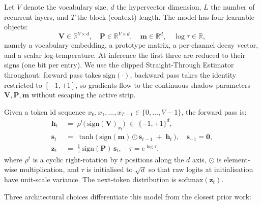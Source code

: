 \documentclass[runningheads]{llncs}
\newcommand{\bipset}{\{-1,+1\}}
\newcommand{\bV}{\mathbf{V}}
\newcommand{\bP}{\mathbf{P}}
\newcommand{\bm}{\mathbf{m}}
\newcommand{\bh}{\mathbf{h}}
\newcommand{\bs}{\mathbf{s}}
\newcommand{\bz}{\mathbf{z}}
\begin{document}
Let $V$ denote the vocabulary size, $d$ the hypervector dimension,
$L$ the number of recurrent layers, and $T$ the block (context) length.
The model has four learnable objects:
\[
\bV \in \mathbb{R}^{V\times d}, \quad
\bP \in \mathbb{R}^{V\times d}, \quad
\bm \in \mathbb{R}^{d}, \quad
\log\tau \in \mathbb{R},
\]
namely a vocabulary embedding, a prototype matrix, a per-channel decay
vector, and a scalar log-temperature. At inference the first three are
reduced to their signs (one bit per entry). We use the clipped
Straight-Through Estimator~\cite{bengio2013estimating,courbariaux2016binaryconnect}
throughout: forward pass takes $\mathrm{sign}(\cdot)$, backward pass
takes the identity restricted to $[-1,+1]$, so gradients flow to the
continuous shadow parameters $\bV, \bP, \bm$ without escaping the
active strip.

Given a token id sequence
$x_0, x_1, \dots, x_{T-1} \in \{0, \dots, V{-}1\}$, the forward pass is:
\begin{align}
\bh_t \;&=\; \rho^{t}\!\bigl(\,\mathrm{sign}(\bV)_{x_t}\bigr) \;\in\; \bipset^{d},
\label{eq:embed}\\[2pt]
\bs_t \;&=\; \tanh\!\bigl(\,\mathrm{sign}(\bm)\odot\bs_{t-1} \;+\; \bh_t\,\bigr),
\quad \bs_{-1}=\mathbf{0},
\label{eq:recur}\\[2pt]
\bz_t \;&=\; \frac{1}{\tau}\,\mathrm{sign}(\bP)\,\bs_t,\quad \tau = e^{\log\tau},
\label{eq:logits}
\end{align}
where $\rho^{t}$ is a cyclic right-rotation by $t$ positions along the
$d$ axis, $\odot$ is element-wise multiplication, and $\tau$ is
initialised to $\sqrt{d}$ so that raw logits at initialisation have
unit-scale variance. The next-token distribution is
$\mathrm{softmax}(\bz_t)$.

Three architectural choices differentiate this model from the closest
prior work:
\end{document}
